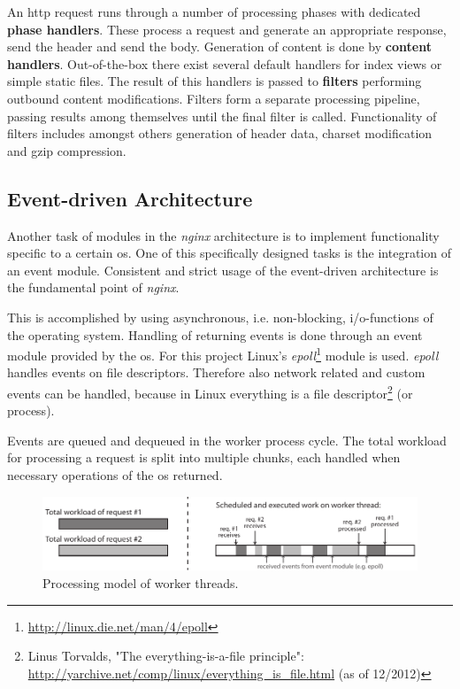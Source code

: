 An \gls{http} request runs through a number of processing phases with dedicated \textbf{phase handlers}. These process a request and generate an appropriate response, send the header and send the body. Generation of content is done by \textbf{content handlers}. Out-of-the-box there exist several default handlers for index views or simple static files. The result of this handlers is passed to \textbf{filters} performing outbound content modifications. Filters form a separate processing pipeline, passing results among themselves until the final filter is called. Functionality of filters includes amongst others generation of header data, charset modification and gzip compression. \cite{aosa}

\subsection{Event-driven Architecture}

Another task of modules in the \textit{nginx} architecture is to implement functionality specific to a certain \gls{os}. One of this specifically designed tasks is the integration of an event module. Consistent and strict usage of the event-driven architecture is the fundamental point of \textit{nginx}.

This is accomplished by using asynchronous, i.e. non-blocking, i/o-functions of the operating system. Handling of returning events is done through an event module provided by the \gls{os}. For this project Linux's \textit{epoll}\footnote{\url{http://linux.die.net/man/4/epoll}} module is used. \textit{epoll} handles events on file descriptors. Therefore also network related and custom events can be handled, because in Linux everything is a file descriptor\footnote{Linus Torvalds, "The everything-is-a-file principle": \url{http://yarchive.net/comp/linux/everything_is_file.html} (as of 12/2012)} (or process).

Events are queued and dequeued in the worker process cycle. The total workload for processing a request is split into multiple chunks, each handled when necessary operations of the \gls{os} returned.

\begin{figure}[H]
	\centering
	\includegraphics[scale=1]{images/nginx-event-proc.pdf}
	\caption{Processing model of worker threads.}
	\label{fig:nginx-event-proc}
\end{figure}

